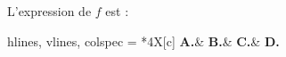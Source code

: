 	L'expression de $f$ est :

\begin{center}
	\begin{tblr}{hlines, vlines, colspec = {*4{X[c]}}}
		\textbf{A.}&
		\textbf{B.}&
		\textbf{C.}&
		\textbf{D.}\\
	\end{tblr}
\end{center}
